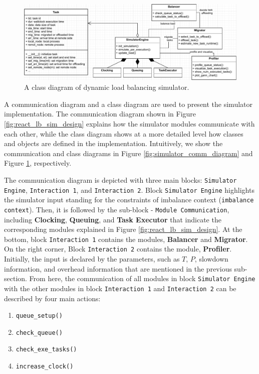 \begin{figure}[t]
  \centering
  \includegraphics[scale=0.65]{./pictures/perf_analysis_model/perf_simulator_class_diagram.pdf}
	\caption{A class diagram of dynamic load balancing simulator.}
	\label{fig:simulator_class_diagram}
\end{figure}

A communication diagram and a class diagram are used to present the simulator implementation. The communication diagram shown in Figure \ref{fig:react_lb_sim_design} explains how the simulator modules communicate with each other, while the class diagram shows at a more detailed level how classes and objects are defined in the implementation. Intuitively, we show the communication and class diagrams in Figure \ref{fig:simulator_comm_diagram} and Figure \ref{fig:simulator_class_diagram}, respectively.

\newpage

The communication diagram is depicted with three main blocks: \texttt{Simulator Engine}, \texttt{Interaction 1}, and \texttt{Interaction 2}. Block \texttt{Simulator Engine} highlights the simulator input standing for the constraints of imbalance context (\texttt{{imbalance context}}). Then, it is followed by the sub-block - \texttt{Module Communication}, including \textbf{Clocking}, \textbf{Queuing}, and \textbf{Task Executor} that indicate the corresponding modules explained in Figure \ref{fig:react_lb_sim_design}. At the bottom, block \texttt{Interaction 1} contains the modules, \textbf{Balancer} and \textbf{Migrator}. On the right corner, Block \texttt{Interaction 2} contains the module, \textbf{Profiler}.\\

Initially, the input is declared by the parameters, such as $T$, $P$, slowdown information, and overhead information that are mentioned in the previous sub-section. From here, the communication of all modules in block \texttt{Simulator Engine} with the other modules in block \texttt{Interaction 1} and \texttt{Interaction 2} can be described by four main actions:
\begin{enumerate}
	\item \texttt{queue\_setup()}
	\item \texttt{check\_queue()}
	\item \texttt{check\_exe\_tasks()}
	\item \texttt{increase\_clock()}
\end{enumerate}

